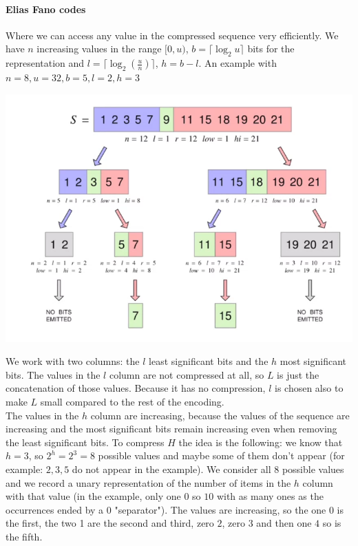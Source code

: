 \documentclass[10pt]{report}
\begin{document}
\paragraph{Elias Fano codes} Where we can access any value in the compressed sequence very efficiently. We have $n$ increasing values in the range $[0, u)$, $b = \lceil\log_2 u\rceil$ bits for the representation and $l = \lceil\log_2(\frac{u}{n})\rceil$, $h = b-l$. An example with $n = 8, u = 32, b = 5, l = 2, h = 3$
\begin{center}
	\includegraphics[scale=0.5]{11.png}
\end{center}
We work with two columns: the $l$ least significant bits and the $h$ most significant bits. The values in the $l$ column are not compressed at all, so $L$ is just the concatenation of those values. Because it has no compression, $l$ is chosen also to make $L$ small compared to the rest of the encoding.\\
The values in the $h$ column are increasing, because the values of the sequence are increasing and the most significant bits remain increasing even when removing the least significant bits. To compress $H$ the idea is the following: we know that $h=3$, so $2^h = 2^3 = 8$ possible values and maybe some of them don't appear (for example: $2,3,5$ do not appear in the example). We consider all 8 possible values and we record a unary representation of the number of items in the $h$ column with that value (in the example, only one $0$ so $10$ with as many ones as the occurrences ended by a $0$ "separator"). The values are increasing, so the one 0 is the first, the two 1 are the second and third, zero $2$, zero $3$ and then one $4$ so is the fifth.\\
\end{document}
